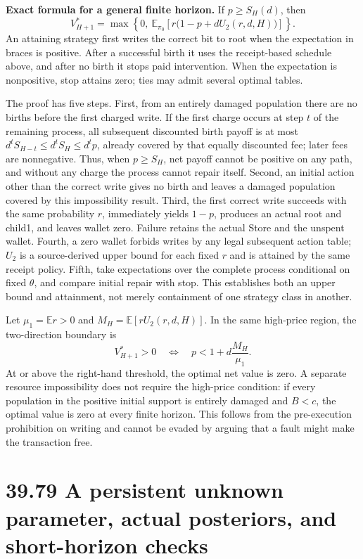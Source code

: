 \documentclass[
  english,
  11pt,
  oneside]{book}
\begin{document}
\textbf{Exact formula for a general finite horizon.} If \(p\ge S_H(d)\), then \[\boxed{\quad
V_{H+1}^*=
\max\left\{0,\ \mathbb E_{\pi_0}\!\left[
r\bigl(1-p+dU_2(r,d,H)\bigr)\right]\right\}.
\quad}\] An attaining strategy first writes the correct bit to root when the expectation in braces is positive. After a successful birth it uses the receipt-based schedule above, and after no birth it stops paid intervention. When the expectation is nonpositive, stop attains zero; ties may admit several optimal tables.

The proof has five steps. First, from an entirely damaged population there are no births before the first charged write. If the first charge occurs at step \(t\) of the remaining process, all subsequent discounted birth payoff is at most \(d^tS_{H-t}\le d^tS_H\le d^tp\), already covered by that equally discounted fee; later fees are nonnegative. Thus, when \(p\ge S_H\), net payoff cannot be positive on any path, and without any charge the process cannot repair itself. Second, an initial action other than the correct write gives no birth and leaves a damaged population covered by this impossibility result. Third, the first correct write succeeds with the same probability \(r\), immediately yields \(1-p\), produces an actual root and child1, and leaves wallet zero. Failure retains the actual Store and the unspent wallet. Fourth, a zero wallet forbids writes by any legal subsequent action table; \(U_2\) is a source-derived upper bound for each fixed \(r\) and is attained by the same receipt policy. Fifth, take expectations over the complete process conditional on fixed \(\theta\), and compare initial repair with stop. This establishes both an upper bound and attainment, not merely containment of one strategy class in another.

Let \(\mu_1=\mathbb E r>0\) and \(M_H=\mathbb E[rU_2(r,d,H)]\). In the same high-price region, the two-direction boundary is \[V_{H+1}^*>0
\quad\Longleftrightarrow\quad
p<1+d\frac{M_H}{\mu_1}.\] At or above the right-hand threshold, the optimal net value is zero. A separate resource impossibility does not require the high-price condition: if every population in the positive initial support is entirely damaged and \(B<c\), the optimal value is zero at every finite horizon. This follows from the pre-execution prohibition on writing and cannot be evaded by arguing that a fault might make the transaction free.

\section{39.79 A persistent unknown parameter, actual posteriors, and short-horizon checks}\label{a-persistent-unknown-parameter-actual-posteriors-and-short-horizon-checks}
\end{document}
